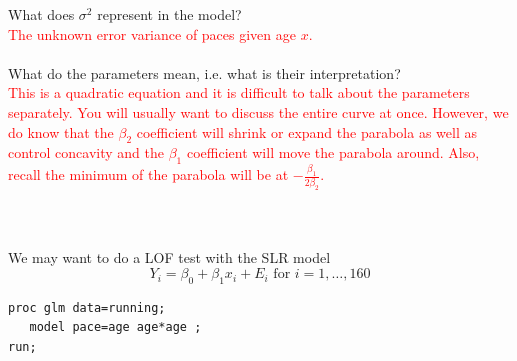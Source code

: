 \newpage

What does $\sigma^2$ represent in the model?%
\textcolor{red}{\\The unknown error variance of paces given age $x$.}\\~\\
What do the parameters mean, i.e. what is their interpretation?%
\textcolor{red}{\\This is a quadratic equation and it is difficult to talk about the parameters separately.  You will usually want to discuss the entire curve at once.  However, we do know that the $\beta_2$ coefficient will shrink or expand the parabola as well as control concavity and the $\beta_1$ coefficient will move the parabola around.  Also, recall the minimum of the parabola will be at $-\frac{\beta_1}{2\beta_2}$. }\\~\\~\\~\\
 

We may want to do a LOF test with the SLR model 
$$ Y_i = \beta_0 + \beta_1 x_i + E_i \mbox{ for }i=1,\ldots,160$$

\begin{small}
\begin{verbatim}
proc glm data=running; 
   model pace=age age*age ; 
run;
\end{verbatim}
\end{small}


